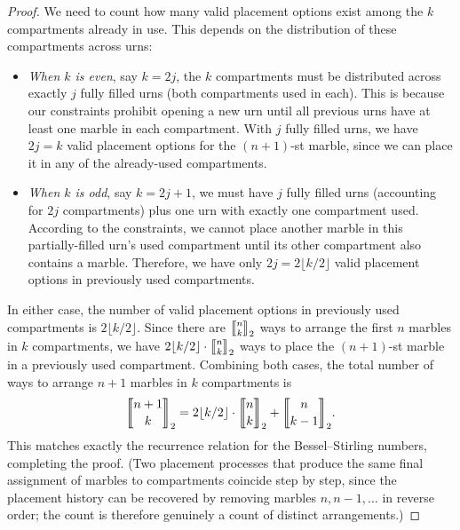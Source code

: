 \documentclass[a4paper]{amsart}
\numberwithin{equation}{section}
\newcommand{\mStirling}[0]{\genfrac{\llbracket}{\rrbracket}{0pt}{}}
\begin{document}
\begin{proof}
We need to count how many valid placement options exist among the $k$ compartments already in use. This depends on the distribution of these compartments across urns:
\begin{itemize}
    \item \textit{When $k$ is even}, say $k = 2j$, the $k$ compartments must be distributed across exactly $j$ fully filled urns (both compartments used in each). This is because our constraints prohibit opening a new urn until all previous urns have at least one marble in each compartment. With $j$ fully filled urns, we have $2j = k$ valid placement options for the $(n+1)$-st marble, since we can place it in any of the already-used compartments.
    \item \textit{When $k$ is odd}, say $k = 2j+1$, we must have $j$ fully filled urns (accounting for $2j$ compartments) plus one urn with exactly one compartment used. According to the constraints, we cannot place another marble in this partially-filled urn's used compartment until its other compartment also contains a marble. Therefore, we have only $2j = 2\lfloor k/2 \rfloor$ valid placement options in previously used compartments.
    \end{itemize}

In either case, the number of valid placement options in previously used compartments is $2\lfloor k/2 \rfloor$. Since there are $\mStirling{n}{k}_2$ ways to arrange the first $n$ marbles in $k$ compartments, we have $2\lfloor k/2 \rfloor \cdot \mStirling{n}{k}_2$ ways to place the $(n+1)$-st marble in a previously used compartment.
Combining both cases, the total number of ways to arrange $n+1$ marbles in $k$ compartments is
\[
\mStirling{n+1}{k}_2 = 2\lfloor k/2 \rfloor \cdot \mStirling{n}{k}_2 + \mStirling{n}{k-1}_2.
\]
This matches exactly the recurrence relation for the Bessel--Stirling numbers, completing the proof. (Two placement processes that produce the same final assignment of marbles to compartments coincide step by step, since the placement history can be recovered by removing marbles $n, n-1, \ldots$ in reverse order; the count is therefore genuinely a count of distinct arrangements.)
\end{proof}
\end{document}
